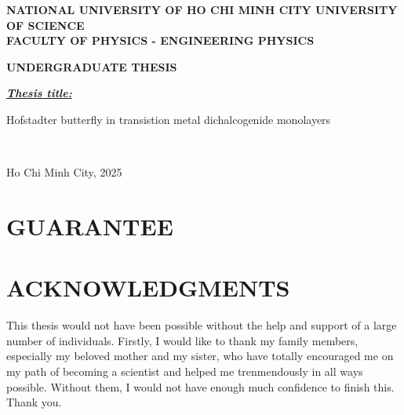 \documentclass{report}
\newcommand{\thesistitlee}{Hofstadter butterfly in transistion metal dichalcogenide monolayers}
\newcommand{\address}{NATIONAL UNIVERSITY OF HO CHI MINH CITY UNIVERSITY OF SCIENCE}
\newcommand{\department}{FACULTY OF PHYSICS - ENGINEERING PHYSICS}
\newcommand{\graddate}{Ho Chi Minh City, 2025}
\begin{document}
\begin{titlepage}
	\begin{center}
		{\bfseries

		{\large {\bf \address}}\\
		{{\textbf{\department}}}\\
		\vspace{2.5cm}

		{\large {\bf UNDERGRADUATE THESIS}}\\
		\vspace{3.0cm}

		}

	\end{center}
	\textit{\textbf{\underline{Thesis title:}}}\\
	\begin{center}
		{\bfseries

			{\largerrr\thesistitlee}
			\vspace{1in}

		}
	\end{center}
	\noindent
	\makebox[\textwidth]{\hfill\makebox[3in]{\hrulefill}}\\
	\begin{center}
	\end{center}
	\begin{center}
		\vspace{2.5in}
		{\graddate}
	\end{center}
\end{titlepage}

\newpage
{}
\pagestyle{fancy}
\renewcommand{\headrulewidth}{0pt}
\fancyhf{}
\fancyfoot[C]{\hspace{0cm} \thepage}
\setcounter{page}{1}

\chapter*{GUARANTEE}


\chapter*{ACKNOWLEDGMENTS}
This thesis would not have been possible without the help and support of a large number of individuals. Firstly, I would like to thank my family members, especially my beloved mother and my sister, who have totally encouraged me on my path of becoming a scientist and helped me trenmendously in all ways possible. Without them, I would not have enough much confidence to finish this. Thank you.
\end{document}
